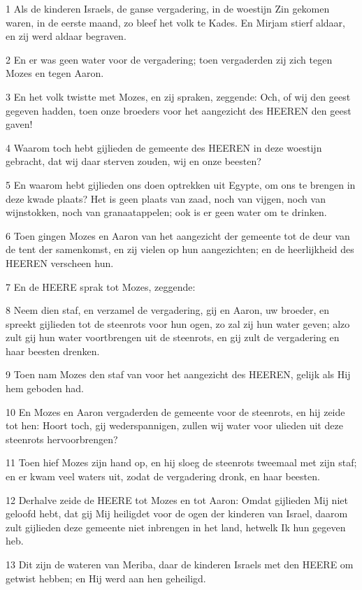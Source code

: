 \par 1 Als de kinderen Israels, de ganse vergadering, in de woestijn Zin gekomen waren, in de eerste maand, zo bleef het volk te Kades. En Mirjam stierf aldaar, en zij werd aldaar begraven.
\par 2 En er was geen water voor de vergadering; toen vergaderden zij zich tegen Mozes en tegen Aaron.
\par 3 En het volk twistte met Mozes, en zij spraken, zeggende: Och, of wij den geest gegeven hadden, toen onze broeders voor het aangezicht des HEEREN den geest gaven!
\par 4 Waarom toch hebt gijlieden de gemeente des HEEREN in deze woestijn gebracht, dat wij daar sterven zouden, wij en onze beesten?
\par 5 En waarom hebt gijlieden ons doen optrekken uit Egypte, om ons te brengen in deze kwade plaats? Het is geen plaats van zaad, noch van vijgen, noch van wijnstokken, noch van granaatappelen; ook is er geen water om te drinken.
\par 6 Toen gingen Mozes en Aaron van het aangezicht der gemeente tot de deur van de tent der samenkomst, en zij vielen op hun aangezichten; en de heerlijkheid des HEEREN verscheen hun.
\par 7 En de HEERE sprak tot Mozes, zeggende:
\par 8 Neem dien staf, en verzamel de vergadering, gij en Aaron, uw broeder, en spreekt gijlieden tot de steenrots voor hun ogen, zo zal zij hun water geven; alzo zult gij hun water voortbrengen uit de steenrots, en gij zult de vergadering en haar beesten drenken.
\par 9 Toen nam Mozes den staf van voor het aangezicht des HEEREN, gelijk als Hij hem geboden had.
\par 10 En Mozes en Aaron vergaderden de gemeente voor de steenrots, en hij zeide tot hen: Hoort toch, gij wederspannigen, zullen wij water voor ulieden uit deze steenrots hervoorbrengen?
\par 11 Toen hief Mozes zijn hand op, en hij sloeg de steenrots tweemaal met zijn staf; en er kwam veel waters uit, zodat de vergadering dronk, en haar beesten.
\par 12 Derhalve zeide de HEERE tot Mozes en tot Aaron: Omdat gijlieden Mij niet geloofd hebt, dat gij Mij heiligdet voor de ogen der kinderen van Israel, daarom zult gijlieden deze gemeente niet inbrengen in het land, hetwelk Ik hun gegeven heb.
\par 13 Dit zijn de wateren van Meriba, daar de kinderen Israels met den HEERE om getwist hebben; en Hij werd aan hen geheiligd.
